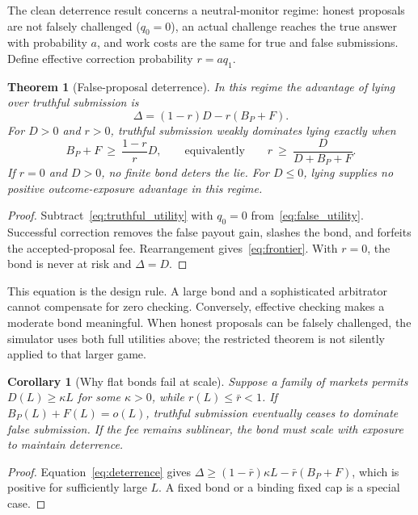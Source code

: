 \documentclass[10pt]{article}
\newtheorem{theorem}{Theorem}
\newtheorem{corollary}{Corollary}
\begin{document}
The clean deterrence result concerns a neutral-monitor regime: honest proposals are not falsely challenged ($q_0=0$), an actual challenge reaches the true answer with probability $a$, and work costs are the same for true and false submissions. Define effective correction probability $r=aq_1$.

\begin{theorem}[False-proposal deterrence]
\label{thm:deterrence}
In this regime the advantage of lying over truthful submission is
\begin{equation}
\Delta=(1-r)D-r(B_P+F).
\label{eq:deterrence}
\end{equation}
For $D>0$ and $r>0$, truthful submission weakly dominates lying exactly when
\begin{equation}
B_P+F\ \geq\ \frac{1-r}{r}D,
\qquad\text{equivalently}\qquad
r\ \geq\ \frac{D}{D+B_P+F}.
\label{eq:frontier}
\end{equation}
If $r=0$ and $D>0$, no finite bond deters the lie. For $D\leq0$, lying supplies no positive outcome-exposure advantage in this regime.
\end{theorem}
\begin{proof}
Subtract~\eqref{eq:truthful_utility} with $q_0=0$ from~\eqref{eq:false_utility}. Successful correction removes the false payout gain, slashes the bond, and forfeits the accepted-proposal fee. Rearrangement gives~\eqref{eq:frontier}. With $r=0$, the bond is never at risk and $\Delta=D$.
\end{proof}

This equation is the design rule. A large bond and a sophisticated arbitrator cannot compensate for zero checking. Conversely, effective checking makes a moderate bond meaningful. When honest proposals can be falsely challenged, the simulator uses both full utilities above; the restricted theorem is not silently applied to that larger game.

\begin{corollary}[Why flat bonds fail at scale]
\label{cor:scaling}
Suppose a family of markets permits $D(L)\geq\kappa L$ for some $\kappa>0$, while $r(L)\leq\bar r<1$. If $B_P(L)+F(L)=o(L)$, truthful submission eventually ceases to dominate false submission. If the fee remains sublinear, the bond must scale with exposure to maintain deterrence.
\end{corollary}
\begin{proof}
Equation~\eqref{eq:deterrence} gives
$\Delta\geq(1-\bar r)\kappa L-\bar r(B_P+F)$, which is positive for sufficiently large $L$. A fixed bond or a binding fixed cap is a special case.
\end{proof}
\end{document}
